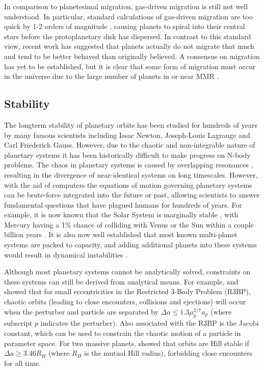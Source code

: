 In comparison to planetesimal migration, gas-driven migration is still not well understood. 
In particular, standard calculations of gas-driven migration are too quick by 1-2 orders of magnitude \citep{Lin1986, Tanaka2002}, causing planets to spiral into their central stars before the protoplanetary disk has dispersed.
In contrast to this standard view, recent work \citep{Fung2017} has suggested that planets actually do not migrate that much and tend to be better behaved than originally believed. 
A consensus on migration has yet to be established, but it is clear that some form of migration must occur in the universe due to the large number of planets in or near MMR \citep{Lissauer2011,Fabrycky2014,Steffen2015}.

\subsection{Stability}
\label{sec:stability}
The longterm stability of planetary orbits has been studied for hundreds of years by many famous scientists including Issac Newton, Joseph-Louis Lagrange and Carl Friederich Gauss. 
However, due to the chaotic and non-integrable nature of planetary systems it has been historically difficult to make progress on N-body problems.  
The chaos in planetary systems is caused by overlapping resonances \citep{Chirikov1979, Lecar2001}, resulting in the divergence of near-identical systems on long timescales. 
However, with the aid of computers the equations of motion governing planetary systems can be brute-force integrated into the future or past, allowing scientists to answer fundamental questions that have plagued humans for hundreds of years. 
For example, it is now known that the Solar System is marginally stable \citep{Sussman1988, Laskar1994, Lecar2001}, with Mercury having a 1\% chance of colliding with Venus or the Sun within a couple billion years \citep{Laskar2009}.
It is also now well established that most known multi-planet systems are packed to capacity, and adding additional planets into these systems would result in dynamical instabilities \citep{Fang2013,Pu2015}.

Although most planetary systems cannot be analytically solved, constraints on these systems can still be derived from analytical means.
For example, \citet{Wisdom1980} and \citet{Duncan1989} showed that for small eccentricities in the Restricted 3-Body Problem (R3BP), chaotic orbits (leading to close encounters, collisions and ejections) will occur when the perturber and particle are separated by $\Delta a \le 1.3\mu_p^{2/7}a_p$ (where subscript $p$ indicates the perturber). 
Also associated with the R3BP is the Jacobi constant, which can be used to constrain the chaotic motion of a particle in parameter space. 
For two massive planets, \citet{Gladman1993} showed that orbits are Hill stable if $\Delta a \ge 3.46 R_H$ (where $R_H$ is the mutual Hill radius), forbidding close encounters for all time.

